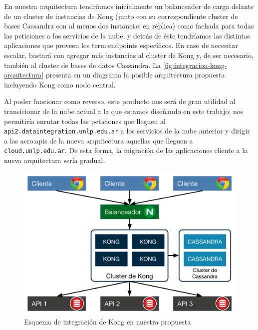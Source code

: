 En nuestra arquitectura tendríamos inicialmente un balanceador de carga delante de un cluster de instancias de Kong (junto con su correspondiente cluster de bases Cassandra con al menos dos instancias en réplica) como fachada para todas las peticiones a los servicios de la nube, y detrás de éste tendríamos las distintas aplicaciones que proveen los \glspl{term:endpoint} específicos. En caso de necesitar escalar, bastará con agregar más instancias al cluster de Kong y, de ser necesario, también al cluster de bases de datos Cassandra. La \autoref{fig:integracion-kong-arquitectura} presenta en un diagrama la posible arquitectura propuesta incluyendo Kong como nodo central.

Al poder funcionar como  reverso, este producto nos será de gran utilidad al transicionar de la nube actual a la que estamos diseñando en este trabajo: nos permitiría enrutar todas las peticiones que lleguen al  \texttt{api2.dataintegration.unlp.edu.ar} a los servicios de la nube anterior y dirigir a las \glspl{acro:api} de la nueva arquitectura aquellas que lleguen a \texttt{cloud.unlp.edu.ar}. De esta forma, la migración de las aplicaciones cliente a la nueva arquitectura sería gradual.

\begin{figure}[H]
  \includegraphics[width=\linewidth]{src/images/03-capitulo-3/tecnologias/kong/kong-integracion-arquitectura.png}
  \caption{Esquema de integración de Kong en nuestra propuesta}
  \label{fig:integracion-kong-arquitectura}
\end{figure}
